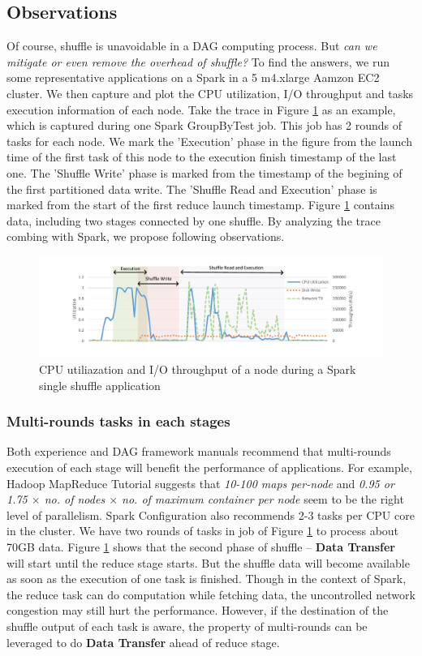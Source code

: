 \subsection{Observations} \label{observation}
Of course, shuffle is unavoidable in a DAG computing process. But \textit{can we mitigate or even remove the overhead of shuffle?} To find the answers, we run some representative applications on a Spark in a 5 m4.xlarge Aamzon EC2 cluster. We then capture and plot the CPU utilization, I/O throughput and tasks execution information of each node. Take the trace in Figure \ref{fig:util} as an example, which is captured during one Spark GroupByTest job. This job has 2 rounds of tasks for each node. We mark the 'Execution' phase in the figure from the launch time of the first task of this node to the execution finish timestamp of the last one. The 'Shuffle Write' phase is marked from the timestamp of the begining of the first partitioned data write. The 'Shuffle Read and Execution' phase is marked from the start of the first reduce launch timestamp.
Figure \ref{fig:util} contains data, including two stages connected by one shuffle. By analyzing the trace combing with Spark, we propose following observations.
\begin{figure}
	\includegraphics[width=\textwidth]{fig/util}
	\caption{CPU utiliazation and I/O throughput of a node during a Spark single shuffle application}
	\label{fig:util}
\end{figure}

\subsubsection{Multi-rounds tasks in each stages}\label{multi}
Both experience and DAG framework manuals recommend that multi-rounds execution of each stage will benefit the performance of applications.
For example, Hadoop MapReduce Tutorial \cite{hadooptutorial} suggests that \textit{10-100 maps per-node} and \textit{0.95 or 1.75 $\times$ no. of nodes $\times$ no. of maximum container per node} seem to be the right level of parallelism. Spark Configuration also recommends 2-3 tasks per CPU core in the cluster\cite{sparkconf}.
We have two rounds of tasks in job of Figure \ref{fig:util} to process about 70GB data. Figure \ref{fig:util} shows that the second phase of shuffle -- \textbf{Data Transfer} will start until the reduce stage starts.
But the shuffle data will become available as soon as the execution of one task is finished. Though in the context of Spark, the reduce task can do computation while fetching data, the uncontrolled network congestion may still hurt the performance. However, if the destination of the shuffle output of each task is aware, the property of multi-rounds can be leveraged to do \textbf{Data Transfer} ahead of reduce stage.

